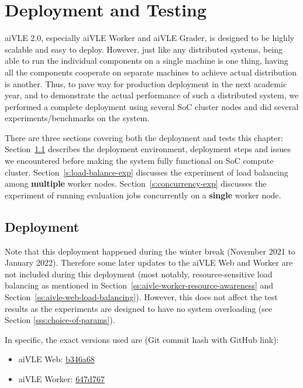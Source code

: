 \chapter{Deployment and Testing}
\label{ch:deployment-and-testing}
aiVLE 2.0, especially aiVLE Worker and aiVLE Grader, is designed to be highly scalable and easy to deploy. However, just like any distributed systems, being able to run the individual components on a single machine is one thing, having all the components cooperate on separate machines to achieve actual distribution is another. Thus, to pave way for production deployment in the next academic year, and to demonstrate the actual performance of such a distributed system, we performed a complete deployment using several SoC cluster nodes and did several experiments/benchmarks on the system.

There are three sections covering both the deployment and tests this chapter: Section~\ref{s:deployment} describes the deployment environment, deployment steps and issues we encountered before making the system fully functional on SoC compute cluster. Section~\ref{s:load-balance-exp} discusses the experiment of load balancing among \textbf{multiple} worker nodes. Section~\ref{s:concurrency-exp} discusses the experiment of running evaluation jobs concurrently on a \textbf{single} worker node.

\section{Deployment}
\label{s:deployment}
Note that this deployment happened during the winter break (November 2021 to January 2022). Therefore some later updates to the aiVLE Web and Worker are not included during this deployment (most notably, resource-sensitive load balancing as mentioned in Section~\ref{ss:aivle-worker-resource-awareness} and Section~\ref{ss:aivle-web-load-balancing}). However, this does not affect the test results as the experiments are designed to have no system overloading (see Section \ref{sss:choice-of-params}).

In specific, the exact versions used are (Git commit hash with GitHub link):
\begin{itemize}
    \item aiVLE Web: \href{https://github.com/edu-ai/aivle-web/commit/b346a68e30aa05656ae2e6cc106414bcba5430fd}{b346a68}
    \item aiVLE Worker: \href{https://github.com/edu-ai/aivle-worker/commit/647d767a72acf6c5f5ded533d77141ca91f4ef9d}{647d767}
\end{itemize}

